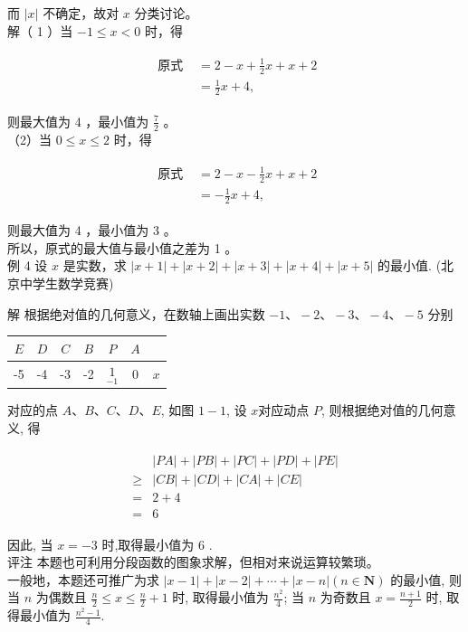 \documentclass[10pt]{article}
\begin{document}
而 $|x|$ 不确定，故对 $x$ 分类讨论。\\
解（ 1 ）当 $-1 \leqslant x<0$ 时，得

\begin{align*}
\begin{aligned}
\text { 原式 } & =2-x+\frac{1}{2} x+x+2 \\
& =\frac{1}{2} x+4,
\end{aligned}
\end{align*}

则最大值为 4 ，最小值为 $\frac{7}{2}$ 。\\
（2）当 $0 \leqslant x \leqslant 2$ 时，得

\begin{align*}
\begin{aligned}
\text { 原式 } & =2-x-\frac{1}{2} x+x+2 \\
& =-\frac{1}{2} x+4,
\end{aligned}
\end{align*}

则最大值为 4 ，最小值为 3 。\\
所以，原式的最大值与最小值之差为 1 。\\
例 4 设 $x$ 是实数，求 $|x+1|+|x+2|+|x+3|+|x+4|+|x+5|$ 的最小值. (北京中学生数学竞赛)

解 根据绝对值的几何意义，在数轴上画出实数 $-1 、-2 、-3 、-4 、-5$ 分别 \begin{tabular}{ccccccc}
$E$ & $D$ & $C$ & $B$ & $P$ & $A$ &  \\
\hline
-5 & -4 & -3 & -2 & $\underset{-1}{1}$ & 0 & $x$ \\
\hline
\end{tabular}对应的点 $A 、 B 、 C 、 D 、 E$, 如图 $1-1$, 设 $x$对应动点 $P$, 则根据绝对值的几何意义, 得

\begin{align*}
\begin{aligned}
& |P A|+|P B|+|P C|+|P D|+|P E| \\
\geqslant & |C B|+|C D|+|C A|+|C E| \\
= & 2+4 \\
= & 6
\end{aligned}
\end{align*}

因此, 当 $x=-3$ 时,取得最小值为 6 .\\
评注 本题也可利用分段函数的图象求解，但相对来说运算较繁琐。\\
一般地，本题还可推广为求 $|x-1|+|x-2|+\cdots+|x-n|(n \in \mathbf{N})$ 的最小值, 则当 $n$ 为偶数且 $\frac{n}{2} \leqslant x \leqslant \frac{n}{2}+1$ 时, 取得最小值为 $\frac{n^{2}}{4}$; 当 $n$ 为奇数且 $x=\frac{n+1}{2}$ 时, 取得最小值为 $\frac{n^{2}-1}{4}$.
\end{document}
